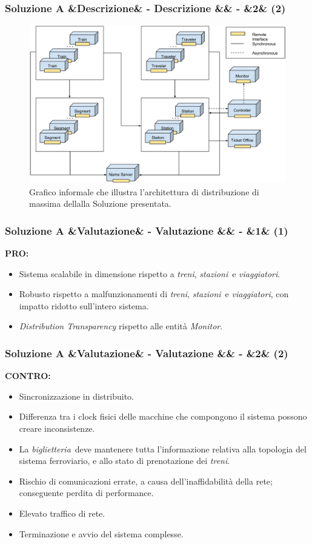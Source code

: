 \documentclass[slidestop,compress,blackandwhite]{beamer}
\newcommand{\ii}[1]{\textit{#1}}
\newcommand{\treni}{\ii{treni}}
\newcommand{\viaggiatori}{\ii{viaggiatori}}
\newcommand{\stazioni}{\ii{stazioni}}
\newcommand{\biglietteria}{\ii{biglietteria}}
\newcommand{\PRO}{\textbf{PRO:}}
\newcommand{\CONTRO}{\textbf{CONTRO:}}
\newcommand{\newtitle}[4]{
	#1 
	\ifx&#2&%
	\else
  		\large- #2
	\fi
	\ifx&#3&%
	\else
  		\normalsize- #3
	\fi
	\ifx&#4&%
	\else
  		\normalsize (#4)
	\fi
}
\newcommand{\newframe}[5]{
	\begin{frame}
		\frametitle{\newtitle{#1}{#2}{#3}{#4}}
		#5
	\end{frame}
}
\begin{document}
	\newframe{Soluzione A}{Descrizione}{}{2}{
		\begin{figure}
			\includegraphics[scale=0.24,trim=0mm 5mm 0mm 20mm]{imgs/All_distributed.pdf}
			\caption{\small{Grafico informale che illustra l'architettura di distribuzione di massima dellalla Soluzione presentata.}}
		\end{figure}
	}
	
			
	
	\newframe{Soluzione A}{Valutazione}{}{1}{
		\PRO
			\begin{itemize}
				\item Sistema scalabile in dimensione rispetto a \treni, \stazioni~e \viaggiatori.
				\item Robusto rispetto a malfunzionamenti di \treni, \stazioni~e \viaggiatori, con impatto ridotto sull'intero sistema.
				\item \ii{Distribution Transparency} rispetto alle entità \ii{Monitor}.
			\end{itemize}
		
	}

	\newframe{Soluzione A}{Valutazione}{}{2}{
		\CONTRO
			\begin{itemize}
				\item Sincronizzazione in distribuito.
				\item Differenza tra i clock fisici delle macchine che compongono il sistema possono creare inconsistenze.
				\item La \biglietteria~deve mantenere tutta l'informazione relativa alla topologia del sistema ferroviario, e allo stato di prenotazione dei \treni.
				\item Rischio di comunicazioni errate, a causa dell'inaffidabilità della rete; conseguente perdita di performance. 
				\item Elevato traffico di rete.
				\item Terminazione e avvio del sistema complesse.
			\end{itemize}
	}
	
\end{document}
